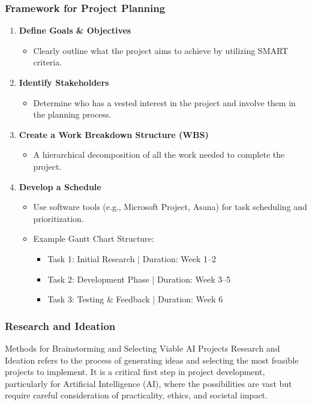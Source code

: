 \documentclass[aspectratio=169]{beamer}
\begin{document}
\begin{frame}[fragile]
  \frametitle{Framework for Project Planning}
  \begin{enumerate}
    \item \textbf{Define Goals \& Objectives}
      \begin{itemize}
        \item Clearly outline what the project aims to achieve by utilizing SMART criteria.
      \end{itemize}

    \item \textbf{Identify Stakeholders}
      \begin{itemize}
        \item Determine who has a vested interest in the project and involve them in the planning process.
      \end{itemize}

    \item \textbf{Create a Work Breakdown Structure (WBS)}
      \begin{itemize}
        \item A hierarchical decomposition of all the work needed to complete the project.
      \end{itemize}

    \item \textbf{Develop a Schedule}
      \begin{itemize}
        \item Use software tools (e.g., Microsoft Project, Asana) for task scheduling and prioritization.
        \item Example Gantt Chart Structure:
          \begin{itemize}
            \item Task 1: Initial Research | Duration: Week 1–2
            \item Task 2: Development Phase | Duration: Week 3–5
            \item Task 3: Testing \& Feedback | Duration: Week 6
          \end{itemize}
      \end{itemize}
  \end{enumerate}
\end{frame}

\begin{frame}[fragile]
    \frametitle{Research and Ideation}
    \begin{block}{Methods for Brainstorming and Selecting Viable AI Projects}
        Research and Ideation refers to the process of generating ideas and selecting the most feasible projects to implement. It is a critical first step in project development, 
        particularly for Artificial Intelligence (AI), where the possibilities are vast but require careful consideration of practicality, ethics, and societal impact.
    \end{block}
\end{frame}
\end{document}
